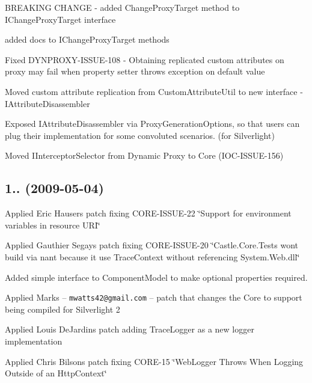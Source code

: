 \begin{DoxyItemize}
\item B\+R\+E\+A\+K\+I\+NG C\+H\+A\+N\+GE -\/ added Change\+Proxy\+Target method to I\+Change\+Proxy\+Target interface
\item added docs to I\+Change\+Proxy\+Target methods
\item Fixed D\+Y\+N\+P\+R\+O\+X\+Y-\/\+I\+S\+S\+U\+E-\/108 -\/ Obtaining replicated custom attributes on proxy may fail when property setter throws exception on default value
\item Moved custom attribute replication from Custom\+Attribute\+Util to new interface -\/ I\+Attribute\+Disassembler
\item Exposed I\+Attribute\+Disassembler via Proxy\+Generation\+Options, so that users can plug their implementation for some convoluted scenarios. (for Silverlight)
\item Moved I\+Interceptor\+Selector from Dynamic Proxy to Core (I\+O\+C-\/\+I\+S\+S\+U\+E-\/156)
\end{DoxyItemize}

\subsection*{1.. (2009-\/05-\/04)}


\begin{DoxyItemize}
\item Applied Eric Hauser\textquotesingle{}s patch fixing C\+O\+R\+E-\/\+I\+S\+S\+U\+E-\/22 \char`\"{}\+Support for environment variables in resource U\+R\+I\char`\"{}
\item Applied Gauthier Segay\textquotesingle{}s patch fixing C\+O\+R\+E-\/\+I\+S\+S\+U\+E-\/20 \char`\"{}\+Castle.\+Core.\+Tests won\textquotesingle{}t build via nant because it use Trace\+Context without referencing System.\+Web.\+dll\char`\"{}
\item Added simple interface to Component\+Model to make optional properties required.
\item Applied Mark\textquotesingle{}s -- {\tt mwatts42@gmail.\+com} -- patch that changes the Core to support being compiled for Silverlight 2
\item Applied Louis De\+Jardin\textquotesingle{}s patch adding Trace\+Logger as a new logger implementation
\item Applied Chris Bilson\textquotesingle{}s patch fixing C\+O\+R\+E-\/15 \char`\"{}\+Web\+Logger Throws When Logging Outside of an Http\+Context\char`\"{}
\end{DoxyItemize}

